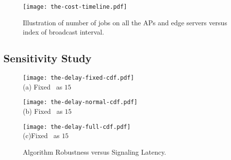 \begin{figure}[ht!]                                                                             %
    \centering                                                                                  %
    \texttt{[image: the-cost-timeline.pdf]}                     %
    \caption{Illustration of number of jobs on all the APs and edge servers versus index of broadcast interval.}
    \label{fig:general_timeline}                                                                %
\end{figure}                                                                                    %

\subsection{Sensitivity Study}
\label{subsec:advance}
\begin{figure*}[ht!]                                                                %
    \centering                                                                      %
    \begin{minipage}[b]{0.30\textwidth}                                             %
        \texttt{[image: the-delay-fixed-cdf.pdf]} \\              %
        {(a) Fixed \brlatency~as $15$}                                              %
    \end{minipage}                                                                  %
    \begin{minipage}[b]{0.30\textwidth}                                             %
        \texttt{[image: the-delay-normal-cdf.pdf]} \\             %
        {(b) Fixed \brlatency~as $15$}           %
    \end{minipage}                                                                  %
    \begin{minipage}[b]{0.30\textwidth}                                             %
        \texttt{[image: the-delay-full-cdf.pdf]} \\               %
        {(c)Fixed \brlatency~as $15$}             %
    \end{minipage}                                                                  %
    \caption{Algorithm Robustness versus Signaling Latency.}                        %
    \label{fig:ss_signal}                                                           %
\end{figure*}                                                                       %

